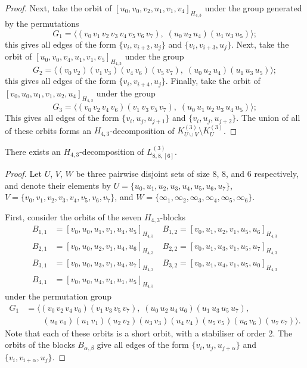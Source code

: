 \begin{subappendices}
\begin{proof}
Next, take the orbit of $[u_0, v_0, v_2, u_1, v_1, v_4]_{H_{4,3}}$ under the group generated by the permutations
\[
    G_1 = \langle (v_0 \, v_1 \, v_2 \, v_3 \, v_4 \, v_5 \, v_6 \, v_7),
    \; (u_0 \, u_2 \, u_4) (u_1 \, u_3 \, u_5) \rangle;
\]
this gives all edges of the form $\{v_i, v_{i+2}, u_j\}$ and $\{v_i, v_{i+3}, u_j\}$.
Next, take the orbit of $[u_0, v_0, v_4, u_1, v_1, v_5]_{H_{4,3}}$ under the group
\[
    G_2 = \langle (v_0 \, v_2) (v_1 \, v_3) (v_4 \, v_6) (v_5 \, v_7), \;
    (u_0 \, u_2 \, u_4) (u_1 \, u_3 \, u_5) \rangle;
\]
this gives all edges of the form $\{v_i, v_{i+4}, u_j\}$.
Finally, take the orbit of $[v_0, u_0, u_1, v_1, u_2, u_4]_{H_{4,3}}$ under the group
\[
    G_3 = \langle (v_0 \, v_2 \, v_4 \, v_6) (v_1 \, v_3 \, v_5 \, v_7), \;
    (u_0 \, u_1 \, u_2 \, u_3 \, u_4 \, u_5) \rangle;
\]
This gives all edges of the form $\{v_i, u_j, u_{j+1}\}$ and $\{v_i, u_j, u_{j+2}\}$.
The union of all of these orbits forms an $H_{4,3}$-decomposition of $K_{U \cup
V}^{(3)} \setminus K_{U}^{(3)}$.
\end{proof}


\begin{example} \label{eg:H_43-l88-k886}
There exists an $H_{4,3}$-decomposition of $L_{8,8,[6]}^{(3)}$.
\end{example}

\begin{proof}
Let $U$, $V$, $W$ be three pairwise disjoint sets of size 8, 8, and 6 respectively, and denote their elements by
  $U = \{u_0, u_1, u_2, u_3, u_4, u_5, u_6, u_7\}$,
  $V = \{v_0, v_1, v_2, v_3, v_4, v_5, v_6, v_7\}$, and
  $W = \{\infty_1, \infty_2, \infty_3, \infty_4, \infty_5, \infty_6\}$.

First, consider the orbits of the seven $H_{4,3}$-blocks
\begin{align*}
    B_{1,1} &= [v_0, u_0, u_1, v_1, u_4, u_5]_{H_{4,3}} \quad
    B_{1,2} = [v_0, u_1, u_2, v_1, u_5, u_6]_{H_{4,3}} \\
    B_{2,1} &= [v_0, u_0, u_2, v_1, u_4, u_6]_{H_{4,3}} \quad
    B_{2,2} = [v_0, u_1, u_3, v_1, u_5, u_7]_{H_{4,3}} \\
    B_{3,1} &= [v_0, u_0, u_3, v_1, u_4, u_7]_{H_{4,3}} \quad
    B_{3,2} = [v_0, u_1, u_4, v_1, u_5, u_0]_{H_{4,3}} \\
    B_{4,1} &= [v_0, u_0, u_4, v_4, u_1, u_5]_{H_{4,3}}
\end{align*}
under the permutation group
\begin{align*}
    G_1 &= \langle (v_0 \, v_2 \, v_4 \, v_6) (v_1 \, v_3 \, v_5 \, v_7),
    \; (u_0 \, u_2 \, u_4 \, u_6) (u_1 \, u_3 \, u_5 \, u_7), \\
    & \quad \quad (u_0 \, v_0) (u_1 \, v_1) (u_2 \, v_2) (u_3 \, v_3) (u_4 \, v_4)
    (u_5 \, v_5) (u_6 \, v_6) (u_7 \, v_7) \rangle.
\end{align*}
Note that each of these orbits is a short orbit, with a stabiliser of order 2.
The orbits of the blocks $B_{\alpha,\beta}$ give all edges of the form $\{v_i, u_j, u_{j+\alpha}\}$ and $\{v_i, v_{i+\alpha}, u_j\}$.


\end{proof}
\end{subappendices}
